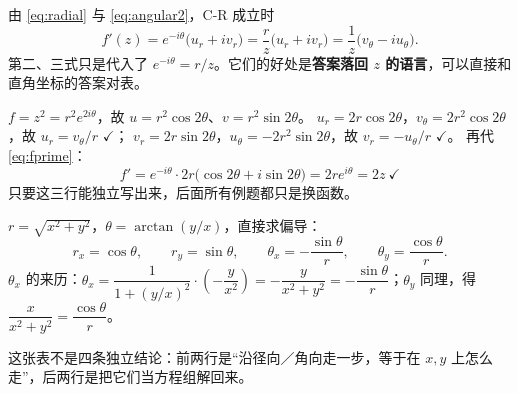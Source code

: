 \documentclass[11pt]{ctexart}
\newcommand{\chk}{\ensuremath{\checkmark}}
\let\origsubhdr\subhdr
\renewcommand{\subhdr}[1]{\par\needspace{4\baselineskip}\origsubhdr{#1}}
\begin{document}



由 \eqref{eq:radial} 与 \eqref{eq:angular2}，C-R 成立时
\begin{equation}\label{eq:fprime}
f'(z)=e^{-i\theta}\bigl(u_r+iv_r\bigr)=\frac{r}{z}\bigl(u_r+iv_r\bigr)=\frac{1}{z}\bigl(v_\theta-iu_\theta\bigr).
\end{equation}
第二、三式只是代入了 $e^{-i\theta}=r/z$。它们的好处是\textbf{答案落回 $z$ 的语言}，可以直接和直角坐标的答案对表。


$f=z^2=r^2e^{2i\theta}$，故 $u=r^2\cos2\theta$、$v=r^2\sin2\theta$。
$u_r=2r\cos2\theta$，$v_\theta=2r^2\cos2\theta$，故 $u_r=v_\theta/r$ \chk；
$v_r=2r\sin2\theta$，$u_\theta=-2r^2\sin2\theta$，故 $v_r=-u_\theta/r$ \chk。
再代 \eqref{eq:fprime}：
\[ f'=e^{-i\theta}\cdot2r\bigl(\cos2\theta+i\sin2\theta\bigr)=2re^{i\theta}=2z\ \chk \]
只要这三行能独立写出来，后面所有例题都只是换函数。



$r=\sqrt{x^2+y^2}$，$\theta=\arctan(y/x)$，直接求偏导：
\begin{equation}\label{eq:coordder}
r_x=\cos\theta,\qquad r_y=\sin\theta,\qquad
\theta_x=-\frac{\sin\theta}{r},\qquad \theta_y=\frac{\cos\theta}{r}.
\end{equation}
$\theta_x$ 的来历：$\theta_x=\dfrac{1}{1+(y/x)^2}\cdot\left(-\dfrac{y}{x^2}\right)=-\dfrac{y}{x^2+y^2}=-\dfrac{\sin\theta}{r}$；$\theta_y$ 同理，得 $\dfrac{x}{x^2+y^2}=\dfrac{\cos\theta}{r}$。


这张表不是四条独立结论：前两行是“沿径向／角向走一步，等于在 $x,y$ 上怎么走”，后两行是把它们当方程组解回来。
\end{document}
